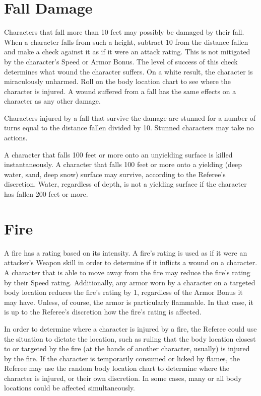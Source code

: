 \documentclass[oneside]{book}
\begin{document}
\begin{multicols}{2}

\section{Fall Damage}

Characters that fall more than 10 feet may possibly be damaged by their fall. When a character falls from such a height, subtract 10 from the distance fallen and make a check against it as if it were an attack rating. This is not mitigated by the character's Speed or Armor Bonus. The level of success of this check determines what wound the character suffers. On a white result, the character is miraculously unharmed. Roll on the body location chart to see where the character is injured. A wound suffered from a fall has the same effects on a character as any other damage. 

Characters injured by a fall that survive the damage are stunned for a number of turns equal to the distance fallen divided by 10. Stunned characters may take no actions. 

A character that falls 100 feet or more onto an unyielding surface is killed instantaneously. A character that falls 100 feet or more onto a yielding (deep water, sand, deep snow) surface may survive, according to the Referee's discretion. Water, regardless of depth, is not a yielding surface if the character has fallen 200 feet or more. 

\section{Fire}

A fire has a rating based on its intensity. A fire's rating is used as if it were an attacker's Weapon skill in order to determine if it inflicts a wound on a character. A character that is able to move away from the fire may reduce the fire's rating by their Speed rating. Additionally, any armor worn by a character on a targeted body location reduces the fire's rating by 1, regardless of the Armor Bonus it may have. Unless, of course, the armor is particularly flammable. In that case, it is up to the Referee's discretion how the fire's rating is affected. 

In order to determine where a character is injured by a fire, the Referee could use the situation to dictate the location, such as ruling that the body location closest to or targeted by the fire (at the hands of another character, usually) is injured by the fire. If the character is temporarily consumed or licked by flames, the Referee may use the random body location chart to determine where the character is injured, or their own discretion. In some cases, many or all body locations could be affected simultaneously.


\end{multicols}
\end{document}
